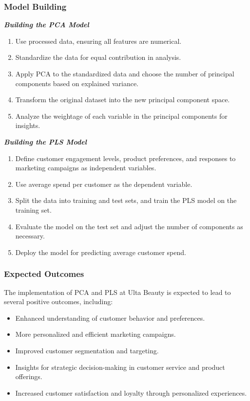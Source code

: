 \documentclass{article}
\begin{document}
\subsubsection{Model Building}
\label{sec:model_building}
\textit{\textbf{Building the PCA Model}}
\begin{enumerate}
    \item Use processed data, ensuring all features are numerical.
    \item Standardize the data for equal contribution in analysis.
    \item Apply PCA to the standardized data and choose the number of principal components based on explained variance.
    \item Transform the original dataset into the new principal component space.
    \item Analyze the weightage of each variable in the principal components for insights.
\end{enumerate}

\textit{\textbf{Building the PLS Model}}
\begin{enumerate}
    \item Define customer engagement levels, product preferences, and responses to marketing campaigns as independent variables.
    \item Use average spend per customer as the dependent variable.
    \item Split the data into training and test sets, and train the PLS model on the training set.
    \item Evaluate the model on the test set and adjust the number of components as necessary.
    \item Deploy the model for predicting average customer spend.
\end{enumerate}

\subsubsection{Expected Outcomes}
\label{sec:expected_outcomes}
The implementation of PCA and PLS at Ulta Beauty is expected to lead to several positive outcomes, including:
\begin{itemize}
    \item Enhanced understanding of customer behavior and preferences.
    \item More personalized and efficient marketing campaigns.
    \item Improved customer segmentation and targeting.
    \item Insights for strategic decision-making in customer service and product offerings.
    \item Increased customer satisfaction and loyalty through personalized experiences.
\end{itemize}
\end{document}
